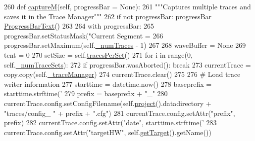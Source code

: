 \begin{DoxyCode}
260     \textcolor{keyword}{def }\hyperlink{classsoftware_1_1chipwhisperer_1_1common_1_1api_1_1CWCoreAPI_1_1CWCoreAPI_a7368a357dd15150809fc809d97870644}{captureM}(self, progressBar = None):
261         \textcolor{stringliteral}{"""Captures multiple traces and saves it in the Trace Manager"""}
262         \textcolor{keywordflow}{if} \textcolor{keywordflow}{not} progressBar: progressBar = \hyperlink{classsoftware_1_1chipwhisperer_1_1common_1_1ui_1_1ProgressBar_1_1ProgressBarText}{ProgressBarText}()
263 
264         with progressBar:
265             progressBar.setStatusMask(\textcolor{stringliteral}{"Current Segment = %
266             progressBar.setMaximum(self.\hyperlink{classsoftware_1_1chipwhisperer_1_1common_1_1api_1_1CWCoreAPI_1_1CWCoreAPI_a46b07fbe99164a89bc2fda38e7299805}{\_numTraces} - 1)
267 
268             waveBuffer = \textcolor{keywordtype}{None}
269             tcnt = 0
270             setSize = self.\hyperlink{classsoftware_1_1chipwhisperer_1_1common_1_1api_1_1CWCoreAPI_1_1CWCoreAPI_acf30a1f42698176fe07692ae548b87f9}{tracesPerSet}()
271             \textcolor{keywordflow}{for} i \textcolor{keywordflow}{in} range(0, self.\hyperlink{classsoftware_1_1chipwhisperer_1_1common_1_1api_1_1CWCoreAPI_1_1CWCoreAPI_a1c721211486a7a52491e7a4feccaee3d}{\_numTraceSets}):
272                 \textcolor{keywordflow}{if} progressBar.wasAborted(): \textcolor{keywordflow}{break}
273                 currentTrace = copy.copy(self.\hyperlink{classsoftware_1_1chipwhisperer_1_1common_1_1api_1_1CWCoreAPI_1_1CWCoreAPI_ad824867ff8b14b6cc7066a24730b089a}{\_traceManager})
274                 currentTrace.clear()
275 
276                 \textcolor{comment}{# Load trace writer information}
277                 starttime = datetime.now()
278                 baseprefix = starttime.strftime(\textcolor{stringliteral}{'%
279                 prefix = baseprefix + \textcolor{stringliteral}{"\_"}
280                 currentTrace.config.setConfigFilename(self.\hyperlink{classsoftware_1_1chipwhisperer_1_1common_1_1api_1_1CWCoreAPI_1_1CWCoreAPI_af10fd1cee5e5bab9c8d562c7045dd21e}{project}().datadirectory + \textcolor{stringliteral}{"traces/config\_
      "} + prefix + \textcolor{stringliteral}{".cfg"})
281                 currentTrace.config.setAttr(\textcolor{stringliteral}{"prefix"}, prefix)
282                 currentTrace.config.setAttr(\textcolor{stringliteral}{"date"}, starttime.strftime(\textcolor{stringliteral}{'%
283                 currentTrace.config.setAttr(\textcolor{stringliteral}{"targetHW"}, self.\hyperlink{classsoftware_1_1chipwhisperer_1_1common_1_1api_1_1CWCoreAPI_1_1CWCoreAPI_a766fa7a99cf7ed210de876a4207caef8}{getTarget}().getName())
}}}
\end{DoxyCode}
